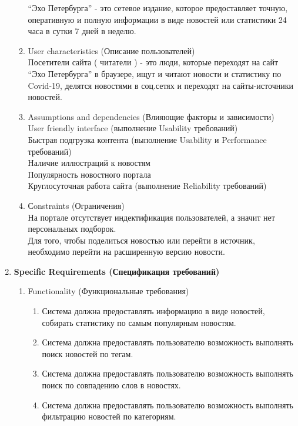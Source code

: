 \begin{enumerate}
\begin{enumerate}[label=2.\arabic*]
        ``Эхо Петербурга'' - это сетевое издание, которое предоставляет точную, оперативную и полную информации в
        виде новостей или статистики 24 часа в сутки 7 дней в неделю.
        \item User characteristics (Описание пользователей) \\
        Посетители сайта ( читатели ) - это люди, которые переходят на сайт ``Эхо Петербурга'' в браузере, ищут и
        читают новости и статистику по Covid-19, делятся новостями в соц.сетях и переходят на сайты-источники новостей.
        \item Assumptions and dependencies (Влияющие факторы и зависимости) \\
        User friendly interface (выполнение Usability требований) \\
        Быстрая подгрузка контента (выполнение Usability и Performance требований)\\
        Наличие иллюстраций к новостям \\
        Популярность новостного портала \\
        Круглосуточная работа сайта (выполнение Reliability требований)
        \item Сonstraints (Ограничения) \\
        На портале отсутствует индектификация пользователей, а значит нет персональных подборок. \\
        Для того, чтобы поделиться новостью или перейти в источник, необходимо перейти на расширенную версию новости.
    \end{enumerate}
    \BgThispage
    \item \textbf{Specific Requirements (Спецификация требований)}
    \begin{enumerate}[label=3.\arabic*]
        \item Functionality (Функциональные требования)
        \begin{enumerate}[label=3.1.\arabic*]
            \item Система должна предоставлять информацию в виде новостей, собирать статистику по самым популярным новостям.
            \item Система должна предоставлять пользователю возможность выполнять поиск новостей по тегам.
            \item Система должна предоставлять пользователю возможность выполнять поиск по совпадению слов в новостях.
            \item Система должна предоставлять пользователю возможность выполнять фильтрацию новостей по категориям.

\end{enumerate}
\end{enumerate}
\end{enumerate}
